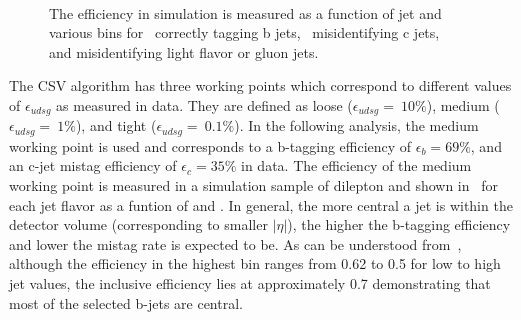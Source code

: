 \begin{figure}
  \\
  \caption{The efficiency in \ttll simulation is measured as a function of jet \pt and various \eta bins for~\protect{} correctly tagging b jets,~\protect{} misidentifying c jets,~\protect{} and misidentifying light flavor or gluon jets.}
  \label{fig:btageff}
\end{figure}

The CSV algorithm has three working points which correspond to different values of $\epsilon_{udsg}$ as measured in data. They are defined as loose ($\epsilon_{udsg}=~10\%$), medium ($\epsilon_{udsg}=~1\%$), and tight ($\epsilon_{udsg}=~0.1\%$). In the following analysis, the medium working point is used and corresponds to a b-tagging efficiency of $\epsilon_{b}=69\%$, and an c-jet mistag efficiency of $\epsilon_{c}=35\%$ in data. The efficiency of the medium working point is measured in a simulation sample of dilepton \ttbar and shown in~ for each jet flavor as a funtion of \pt and \eta. In general, the more central a jet is within the detector volume (corresponding to smaller $|\eta|$), the higher the b-tagging efficiency and lower the mistag rate is expected to be. As can be understood from~, although the efficiency in the highest \eta bin ranges from 0.62 to 0.5 for low to high jet \pt values, the inclusive efficiency lies at approximately 0.7 demonstrating that most of the selected b-jets are central. 

